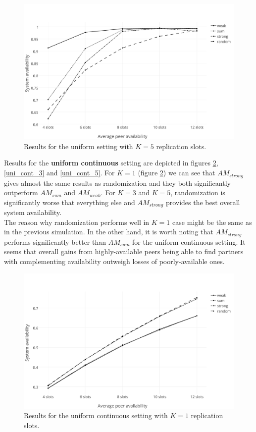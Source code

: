 \documentclass{pracamgren}
\begin{document}
\begin{figure}[h]
\centering
\includegraphics[scale=0.5]{graphs/uniform_5.pdf}
\caption{Results for the uniform setting with $K=5$ replication slots.}
\label{uniform_5}
\end{figure}

\newpage

Results for the {\bf uniform continuous} setting are depicted in figures \ref{uni_cont_1}, \ref{uni_cont_3} and \ref{uni_cont_5}. For $K=1$ (figure \ref{uni_cont_1}) we can see that $AM_{strong}$ gives almost the same results as randomization and they both significantly outperform $AM_{sum}$ and $AM_{weak}$. For $K=3$ and $K=5$, randomization is significantly worse that everything else and $AM_{strong}$ provides the best overall system availability.\\

The reason why randomization performs well in $K=1$ case might be the same as in the previous simulation. In the other hand, it is worth noting that $AM_{strong}$ performs significantly better than $AM_{sum}$ for the uniform continuous setting. It seems that overall gains from highly-available peers being able to find partners with complementing availability outweigh losses of poorly-available ones.\\

\begin{figure}[h]
\centering
\includegraphics[scale=0.5]{graphs/uni_cont_1.pdf}
\caption{Results for the uniform continuous setting with $K=1$ replication slots.}
\label{uni_cont_1}
\end{figure}
\end{document}
